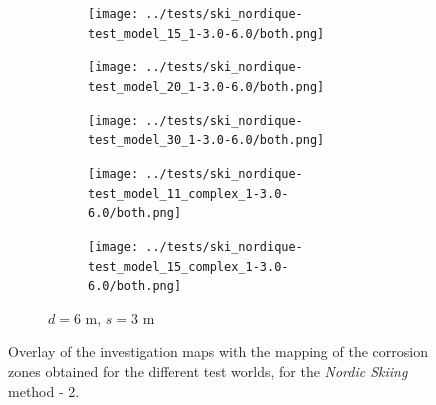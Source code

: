 \documentclass[english,RandD]{rapportPFE}  %
\begin{document}
\begin{figure}[H]
\begin{subfigure}[t]{\linewidth}
				\hfill
				\begin{subfigure}[t]{0.11\linewidth}
					\texttt{[image: ../tests/ski\_nordique-test\_model\_15\_1-3.0-6.0/both.png]}
				\end{subfigure}
				\hfill
				\begin{subfigure}[t]{0.11\linewidth}
					\texttt{[image: ../tests/ski\_nordique-test\_model\_20\_1-3.0-6.0/both.png]}
				\end{subfigure}
				\hfill
				\begin{subfigure}[t]{0.11\linewidth}
					\texttt{[image: ../tests/ski\_nordique-test\_model\_30\_1-3.0-6.0/both.png]}
				\end{subfigure}
				\hfill
				\begin{subfigure}[t]{0.11\linewidth}
					\texttt{[image: ../tests/ski\_nordique-test\_model\_11\_complex\_1-3.0-6.0/both.png]}
				\end{subfigure}
				\hfill
				\begin{subfigure}[t]{0.11\linewidth}
					\texttt{[image: ../tests/ski\_nordique-test\_model\_15\_complex\_1-3.0-6.0/both.png]}
				\end{subfigure}
				\caption{$d = 6$ m, $s = 3$ m}
			\end{subfigure}
			\caption{Overlay of the investigation maps with the mapping of the corrosion zones obtained for the different test worlds, for the \textit{Nordic Skiing} method - 2.}
			\label{fig:ski_nordique_resultats_2}
		\end{figure}
\end{document}
